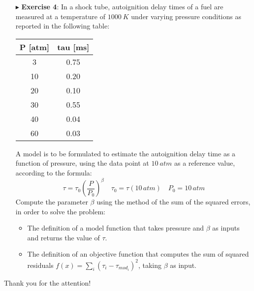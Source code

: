 \documentclass[xcolor={dvipsnames,rgb}, aspectratio=169]{beamer}
\begin{document}
\begin{frame}
   \scriptsize{
      \begin{itemize}
         \item[$\blacktriangleright$] \textbf{Exercise 4}: In a shock tube, autoignition
            delay times of a fuel are measured at a temperature of $1000 \: K$ under varying
            pressure conditions as reported in the following table:
            \begin{table}[]
               \begin{tabular}{c  c}
                  P [atm] & tau [ms]\\ \hline
                  3  & 0.75 \\
                  10 & 0.20 \\
                  20 & 0.10 \\
                  30 & 0.55 \\
                  40 & 0.04 \\
                  60 & 0.03 \\ \hline
               \end{tabular}
            \end{table}
            A model is to be formulated to estimate the autoignition delay time as a
            function of pressure, using the data point at $10 \: atm$ as a reference value,
            according to the formula:
            \begin{equation*}
               \tau = \tau_0 \left(\frac{P}{P_0}\right)^\beta \quad  \tau_0 = \tau (10\,
               atm) \quad P_0 = 10 \, atm
            \end{equation*}
            Compute the parameter $\beta$ using the method of the sum of the squared errors,
            in order to solve the problem:
            \begin{itemize}
               \item The definition of a model function that takes pressure and $\beta$ as
                  inputs and returns the value of $\tau$.
               \item The definition of an objective function that computes the sum of
                  squared residuals $f(x) = \sum_{i} \left(\tau_i -
                  \tau_{mod_{i}}\right)^2$, taking $\beta$ as input.
            \end{itemize}
      \end{itemize}
   }
\end{frame}

{%
\begin{frame}[standout]
	Thank you for the attention!
\end{frame}
}
\end{document}
